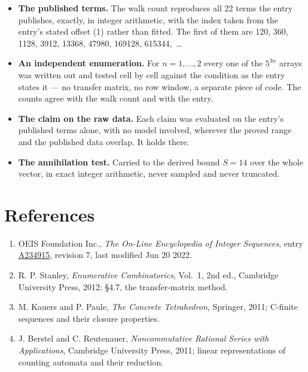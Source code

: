 \documentclass[11pt]{article}
\theoremstyle{definition}
\begin{document}
\begin{itemize}

\item {\bfseries The published terms.} The walk count reproduces all 22 terms the entry publishes, exactly, in integer arithmetic, with the index taken from the entry's stated offset (1) rather than fitted. The first of them are 120, 360, 1128, 3912, 13368, 47980, 169128, 615344,~\dots

\item {\bfseries An independent enumeration.} For $n = 1,\dots,2$ every one of the $5^{3n}$ arrays was written out and tested cell by cell against the condition as the entry states it --- no transfer matrix, no row window, a separate piece of code. The counts agree with the walk count and with the entry.

\item {\bfseries The claim on the raw data.} Each claim was evaluated on the entry's published terms alone, with no model involved, wherever the proved range and the published data overlap. It holds there.

\item {\bfseries The annihilation test.} Carried to the derived bound $S = 14$ over the whole vector, in exact integer arithmetic, never sampled and never truncated.

\end{itemize}

\section{References}

\begin{enumerate}

\item OEIS Foundation Inc., \emph{The On-Line Encyclopedia of Integer Sequences}, entry \href{https://oeis.org/A234915}{A234915}, revision 7, last modified Jun 20 2022.

\item R. P. Stanley, \emph{Enumerative Combinatorics}, Vol.~1, 2nd ed., Cambridge University Press, 2012; \S4.7, the transfer-matrix method.

\item M. Kauers and P. Paule, \emph{The Concrete Tetrahedron}, Springer, 2011; C-finite sequences and their closure properties.

\item J. Berstel and C. Reutenauer, \emph{Noncommutative Rational Series with Applications}, Cambridge University Press, 2011; linear representations of counting automata and their reduction.

\end{enumerate}
\end{document}
